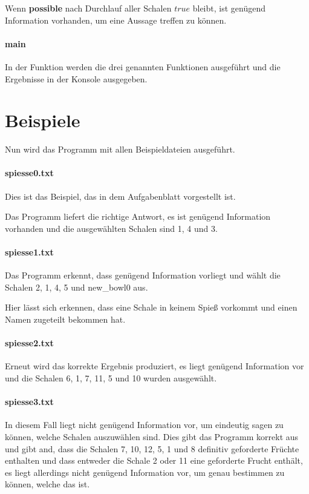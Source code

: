 \documentclass[a4paper,10pt,ngerman]{scrartcl}
\begin{document}
Wenn \textbf{possible} nach Durchlauf aller Schalen $true$ bleibt, ist genügend Information vorhanden, um eine Aussage treffen zu können.

\paragraph{\textbf{main}}
In der  Funktion werden die drei genannten Funktionen ausgeführt und die Ergebnisse in der Konsole ausgegeben.

\section{Beispiele}
Nun wird das Programm mit allen Beispieldateien ausgeführt.

\paragraph{spiesse0.txt}
Dies ist das Beispiel, das in dem Aufgabenblatt vorgestellt ist.

Das Programm liefert die richtige Antwort, es ist genügend Information vorhanden und die ausgewählten Schalen sind 1, 4 und 3.

\paragraph{spiesse1.txt}
Das Programm erkennt, dass genügend Information vorliegt und wählt die Schalen 2, 1, 4, 5 und new\_bowl0 aus.

Hier lässt sich erkennen, dass eine Schale in keinem Spieß vorkommt und einen Namen zugeteilt bekommen hat.

\paragraph{spiesse2.txt}
Erneut wird das korrekte Ergebnis produziert, es liegt genügend Information vor und die Schalen 6, 1, 7, 11, 5 und 10 wurden ausgewählt.

\paragraph{spiesse3.txt}
In diesem Fall liegt nicht genügend Information vor, um eindeutig sagen zu können, welche Schalen auszuwählen sind.
Dies gibt das Programm korrekt aus und gibt and, dass die Schalen 7, 10, 12, 5, 1 und 8 definitiv geforderte Früchte enthalten und dass entweder die Schale 2 oder 11 eine geforderte Frucht enthält, es liegt allerdings nicht genügend Information vor, um genau bestimmen zu können, welche das ist.
\end{document}
